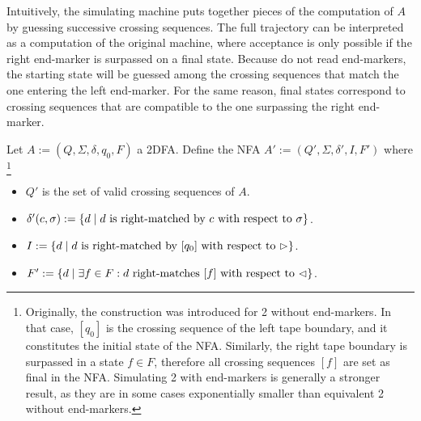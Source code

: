 Intuitively, the simulating machine puts together pieces of the computation of $A$ by guessing successive crossing sequences.
The full trajectory can be interpreted as a computation of the original machine, where acceptance is only possible if the right end-marker is surpassed on a final state.
Because \NFAs{} do not read end-markers, the starting state will be guessed among the crossing sequences that match the one entering the left end-marker.
For the same reason, final states correspond to crossing sequences that are compatible to the one surpassing the right end-marker.

Let $A:=(Q,\Sigma,\delta,q_0,F)$ a 2DFA.
Define the NFA $A':=(Q',\Sigma,\delta',I,F')$ where
\footnote{
	Originally, the construction was introduced for 2\DFAs{} without end-markers.
	In that case, $[q_0]$ is the crossing sequence of the left tape boundary, and it constitutes the initial state of the NFA.
	Similarly, the right tape boundary is surpassed in a state $f\in F$, therefore all crossing sequences $[f]$ are set as final in the NFA.
	Simulating 2\DFAs{} with end-markers is generally a stronger result, as they are in some cases exponentially smaller than equivalent 2\DFAs{} without end-markers.
}
\begin{itemize}
	\item $Q'$ is the set of valid crossing sequences of $A$.
	\item $\delta'(c,\sigma):=\{d \mid \text{$d$ is right-matched by $c$ with respect to $\sigma$}\}$.
	\item $I:=\{d\mid \text{$d$ is right-matched by $[q_0]$ with respect to $\rhd$}\}$.
	\item $F':=\{d\mid \exists f\in F: \text{$d$ right-matches $[f]$ with respect to $\lhd$}\}$.
\end{itemize}


